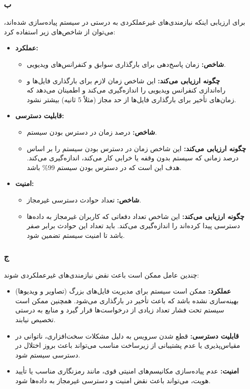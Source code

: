 \pagebreak
\subsubsection*{ب}

برای ارزیابی اینکه نیازمندی‌های غیرعملکردی به درستی در سیستم پیاده‌سازی شده‌اند، می‌توان از شاخص‌های زیر استفاده کرد:

\begin{itemize}
    \item \textbf{عملکرد:} 
    \begin{itemize}
        \item \textbf{شاخص:} زمان پاسخ‌دهی برای بارگذاری سوابق و کنفرانس‌های ویدیویی.
        \item \textbf{چگونه ارزیابی می‌کند:} این شاخص زمان لازم برای بارگذاری فایل‌ها و راه‌اندازی کنفرانس ویدیویی را اندازه‌گیری می‌کند و اطمینان می‌دهد که زمان‌های تأخیر برای بارگذاری فایل‌ها از حد مجاز (مثلاً 5 ثانیه) بیشتر نشود.
    \end{itemize}
    \item \textbf{قابلیت دسترسی:}
    \begin{itemize}
        \item \textbf{شاخص:} درصد زمان در دسترس بودن سیستم.
        \item \textbf{چگونه ارزیابی می‌کند:} این شاخص زمان در دسترس بودن سیستم را بر اساس درصد زمانی که سیستم بدون وقفه یا خرابی کار می‌کند، اندازه‌گیری می‌کند. هدف این است که در دسترس بودن سیستم 99\% باشد.
    \end{itemize}
    \item \textbf{امنیت:}
    \begin{itemize}
        \item \textbf{شاخص:} تعداد حوادث دسترسی غیرمجاز.
        \item \textbf{چگونه ارزیابی می‌کند:} این شاخص تعداد دفعاتی که کاربران غیرمجاز به داده‌ها دسترسی پیدا کرده‌اند را اندازه‌گیری می‌کند. باید تعداد این حوادث برابر صفر باشد تا امنیت سیستم تضمین شود.
    \end{itemize}
\end{itemize}

\subsubsection*{ج}

چندین عامل ممکن است باعث نقض نیازمندی‌های غیرعملکردی شوند:

\begin{itemize}
    \item \textbf{عملکرد:} ممکن است سیستم برای مدیریت فایل‌های بزرگ (تصاویر و ویدیوها) بهینه‌سازی نشده باشد که باعث تأخیر در بارگذاری می‌شود. همچنین ممکن است سیستم تحت فشار تعداد زیادی از درخواست‌ها قرار گیرد و منابع به درستی تخصیص نیابند.
    \item \textbf{قابلیت دسترسی:} قطع شدن سرویس به دلیل مشکلات سخت‌افزاری، ناتوانی در مقیاس‌پذیری یا عدم پشتیبانی از زیرساخت مناسب می‌تواند باعث بروز اختلال در دسترسی سیستم شود.
    \item \textbf{امنیت:} عدم پیاده‌سازی مکانیسم‌های امنیتی قوی، مانند رمزنگاری مناسب یا تأیید هویت، می‌تواند باعث نقض امنیت و دسترسی غیرمجاز به داده‌ها شود.
\end{itemize}


